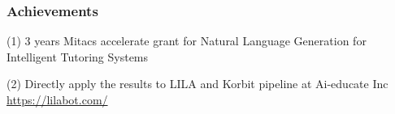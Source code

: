 \documentclass{beamer}
\begin{document}
\begin{frame}
\frametitle{Achievements}
(1) 3 years Mitacs accelerate grant for Natural Language Generation for Intelligent Tutoring Systems \\
\begin{center}
	
\end{center}
(2) Directly apply the results to LILA and Korbit pipeline  at Ai-educate Inc \\

\url{https://lilabot.com/} \\




\end{frame}

\end{document}
